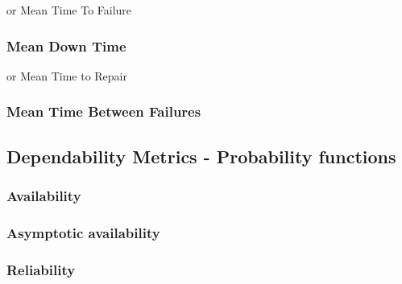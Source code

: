 or Mean Time To Failure

\subsubsection{Mean Down Time}

or Mean Time to Repair

\subsubsection{Mean Time Between Failures}



\subsection{Dependability Metrics - Probability functions}

\subsubsection{Availability}

\subsubsection{Asymptotic availability}

\subsubsection{Reliability}






